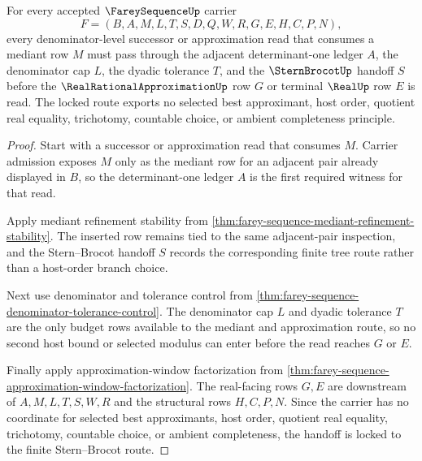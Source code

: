 \begin{theorem}
\label{thm:farey-sequence-stern-brocot-handoff-lock}
For every accepted $\FareySequenceUp$ carrier
$$
F=(B,A,M,L,T,S,D,Q,W,R,G,E,H,C,P,N),
$$
every denominator-level successor or approximation read that consumes a mediant row $M$ must pass through the adjacent determinant-one ledger $A$, the denominator cap $L$, the dyadic tolerance $T$, and the $\SternBrocotUp$ handoff $S$ before the $\RealRationalApproximationUp$ row $G$ or terminal $\RealUp$ row $E$ is read. The locked route exports no selected best approximant, host order, quotient real equality, trichotomy, countable choice, or ambient completeness principle.
\end{theorem}
\begin{proof}
Start with a successor or approximation read that consumes $M$. Carrier admission exposes $M$ only as the mediant row for an adjacent pair already displayed in $B$, so the determinant-one ledger $A$ is the first required witness for that read.

Apply mediant refinement stability from \autoref{thm:farey-sequence-mediant-refinement-stability}. The inserted row remains tied to the same adjacent-pair inspection, and the Stern--Brocot handoff $S$ records the corresponding finite tree route rather than a host-order branch choice.

Next use denominator and tolerance control from \autoref{thm:farey-sequence-denominator-tolerance-control}. The denominator cap $L$ and dyadic tolerance $T$ are the only budget rows available to the mediant and approximation route, so no second host bound or selected modulus can enter before the read reaches $G$ or $E$.

Finally apply approximation-window factorization from \autoref{thm:farey-sequence-approximation-window-factorization}. The real-facing rows $G,E$ are downstream of $A,M,L,T,S,W,R$ and the structural rows $H,C,P,N$. Since the carrier has no coordinate for selected best approximants, host order, quotient real equality, trichotomy, countable choice, or ambient completeness, the handoff is locked to the finite Stern--Brocot route.
\end{proof}

